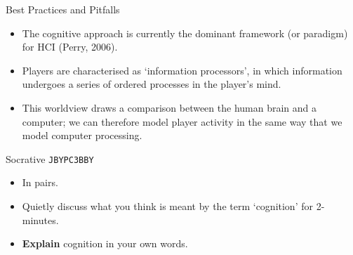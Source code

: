 \begin{frame}{Best Practices and Pitfalls}
	\begin{itemize}
		\item The cognitive approach is currently the dominant framework (or paradigm) for HCI (Perry, 2006).
		\item Players are characterised as `information processors', in which information undergoes a series of ordered processes
		in the player's mind.
		\item This worldview draws a comparison between the human brain and a computer; we can therefore model player activity in the same
		way that we model computer processing.
	\end{itemize}
\end{frame}

\begin{frame}[fragile]{Socrative \texttt{JBYPC3BBY}}
	\begin{itemize}
		\item In pairs.
		\item Quietly discuss what you think is meant by the term `cognition' for 2-minutes.
		\item \textbf{Explain} cognition in your own words.
	\end{itemize}
\end{frame}
